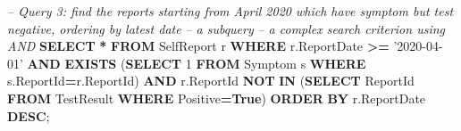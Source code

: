 \documentclass[
]{article}
\newenvironment{Shaded}{\begin{snugshade}}{\end{snugshade}}
\newcommand{\CommentTok}[1]{\textcolor[rgb]{0.56,0.35,0.01}{\textit{#1}}}
\newcommand{\DecValTok}[1]{\textcolor[rgb]{0.00,0.00,0.81}{#1}}
\newcommand{\KeywordTok}[1]{\textcolor[rgb]{0.13,0.29,0.53}{\textbf{#1}}}
\newcommand{\NormalTok}[1]{#1}
\newcommand{\OperatorTok}[1]{\textcolor[rgb]{0.81,0.36,0.00}{\textbf{#1}}}
\newcommand{\StringTok}[1]{\textcolor[rgb]{0.31,0.60,0.02}{#1}}
\begin{document}
\begin{Shaded}
\begin{Highlighting}[]
\CommentTok{-- Query 3: find the reports starting from April 2020 which have symptom but test negative, ordering by latest date}
\CommentTok{-- a subquery}
\CommentTok{-- a complex search criterion using AND}
\KeywordTok{SELECT} \OperatorTok{*}
\KeywordTok{FROM}\NormalTok{ SelfReport r}
\KeywordTok{WHERE}\NormalTok{ r.ReportDate }\OperatorTok{>=} \StringTok{'2020-04-01'}
\KeywordTok{AND} \KeywordTok{EXISTS}\NormalTok{ (}\KeywordTok{SELECT} \DecValTok{1} \KeywordTok{FROM}\NormalTok{ Symptom s }\KeywordTok{WHERE}\NormalTok{ s.ReportId}\OperatorTok{=}\NormalTok{r.ReportId)}
\KeywordTok{AND}\NormalTok{ r.ReportId }\KeywordTok{NOT} \KeywordTok{IN}\NormalTok{ (}\KeywordTok{SELECT}\NormalTok{ ReportId }\KeywordTok{FROM}\NormalTok{ TestResult }\KeywordTok{WHERE}\NormalTok{ Positive}\OperatorTok{=}\KeywordTok{True}\NormalTok{)}
\KeywordTok{ORDER} \KeywordTok{BY}\NormalTok{ r.ReportDate }\KeywordTok{DESC}\NormalTok{;}






\end{Highlighting}
\end{Shaded}
\end{document}
